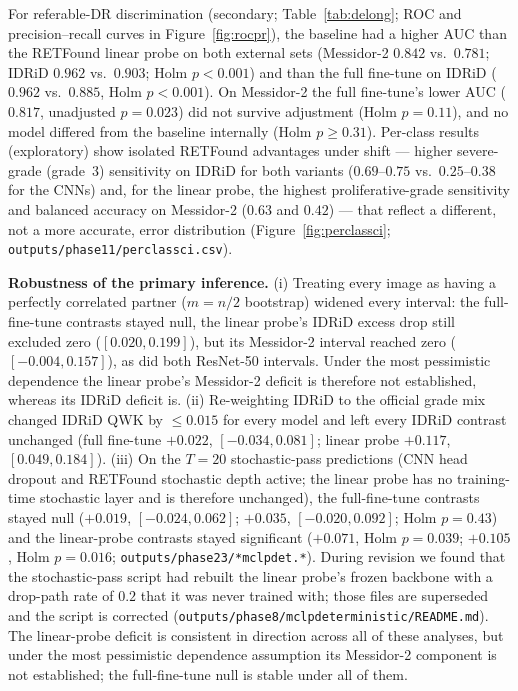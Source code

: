 \documentclass[journal]{IEEEtran}
\renewcommand{\_}{\origunderscore\allowbreak}
\begin{document}
For referable-DR discrimination (secondary; Table~\ref{tab:delong}; ROC and
precision--recall curves in Figure~\ref{fig:rocpr}), the baseline had a higher
AUC than the RETFound linear probe on both external sets (Messidor-2 $0.842$
vs.\ $0.781$; IDRiD $0.962$ vs.\ $0.903$; Holm $p<0.001$) and than the
full fine-tune on IDRiD ($0.962$ vs.\ $0.885$, Holm $p<0.001$). On Messidor-2
the full fine-tune's lower AUC ($0.817$, unadjusted $p=0.023$) did not survive
adjustment (Holm $p=0.11$), and no model differed from the baseline internally
(Holm $p\geq 0.31$). Per-class results (exploratory) show isolated RETFound
advantages under shift --- higher severe-grade (grade~3) sensitivity on IDRiD
for both variants ($0.69$--$0.75$ vs.\ $0.25$--$0.38$ for the CNNs) and, for the
linear probe, the highest proliferative-grade sensitivity and balanced accuracy
on Messidor-2 ($0.63$ and $0.42$) --- that reflect a different, not a more
accurate, error distribution (Figure~\ref{fig:perclassci};
\texttt{outputs/\allowbreak{}phase11/\allowbreak{}per\_class\_ci.csv}).

\textbf{Robustness of the primary inference.} (i) Treating every image as
having a perfectly correlated partner ($m=n/2$ bootstrap) widened every interval:
the full-fine-tune contrasts stayed null, the linear probe's IDRiD excess drop
still excluded zero ($[0.020,0.199]$), but its Messidor-2 interval reached zero
($[-0.004,0.157]$), as did both ResNet-50 intervals. Under the most pessimistic
dependence the linear probe's Messidor-2 deficit is therefore not
established, whereas its IDRiD deficit is. (ii) Re-weighting IDRiD to the
official grade mix changed IDRiD QWK by $\leq 0.015$ for every model and left
every IDRiD contrast unchanged (full fine-tune $+0.022$, $[-0.034,0.081]$; linear
probe $+0.117$, $[0.049,0.184]$). (iii) On the $T=20$ stochastic-pass
predictions (CNN head dropout and RETFound stochastic depth active; the linear
probe has no training-time stochastic layer and is therefore unchanged), the
full-fine-tune contrasts stayed null ($+0.019$, $[-0.024,0.062]$; $+0.035$,
$[-0.020,0.092]$; Holm $p=0.43$) and the linear-probe contrasts stayed
significant ($+0.071$, Holm $p=0.039$; $+0.105$, Holm $p=0.016$;
\texttt{outputs/\allowbreak{}phase23/\allowbreak{}*\_mc\_lpdet.*}). During
revision we found that the stochastic-pass script had rebuilt the linear probe's
frozen backbone with a drop-path rate of $0.2$ that it was never trained with;
those files are superseded and the script is corrected
(\texttt{outputs/\allowbreak{}phase8/\allowbreak{}mc\_lp\_deterministic/\allowbreak{}README.md}). The linear-probe
deficit is consistent in direction across all of these analyses, but under the
most pessimistic dependence assumption its Messidor-2 component is not
established; the full-fine-tune null is stable under all of them.
\end{document}
